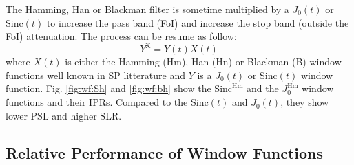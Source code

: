 \documentclass[useAMS,usenatbib]{mn2e}
\newcommand{\OMS}[1]{\textcolor{red}{{\bf OMS: #1}}}
\newcommand{\ATM}[1]{\textcolor{blue}{{\bf Marcellin: #1}}}
\newcommand{\GSF}[1]{\textcolor{red}{{\bf GSF: #1}}}
\begin{document}
% 

The Hamming, Han or Blackman filter is sometime multiplied by 
a $J_0(t)$ or $\mathrm{Sinc}(t)$ to increase the pass band (FoI) and 
increase the stop band (outside the FoI) attenuation.
The process can be resume as follow:
\begin{equation}
Y^\mathrm{X} = Y(t) X(t) 
\end{equation}
where $X(t)$ is either the Hamming (Hm), Han (Hn) or Blackman (B) window functions well known in SP litterature
\citep{nuttall1982spectral,podder2014comparative} and $Y$ is a $J_0(t)$ or $\mathrm{Sinc}(t)$ window function.
Fig. \ref{fig:wf:Sh} and \ref{fig:wf:bh} show the  $\mathrm{Sinc}^\mathrm{Hm}$  and the $J_0^\mathrm{Hm}$ window functions and their IPRs. 
Compared to the $\mathrm{Sinc}(t)$ and $J_0(t)$, they show lower PSL and higher SLR.

\subsection{Relative Performance of Window Functions}
\end{document}
